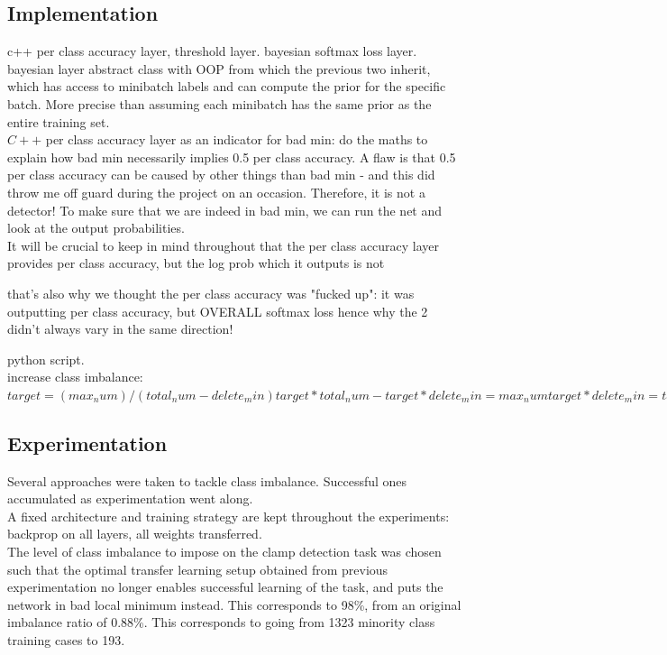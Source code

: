\documentclass[a4paper,11pt]{article}
\begin{document}
\subsection{Implementation}

c++ per class accuracy layer, threshold layer. bayesian softmax loss layer. bayesian layer abstract class with OOP from which the previous two inherit, which has access to minibatch labels and can compute the prior for the specific batch. More precise than assuming each minibatch has the same prior as the entire training set. \\

$C++$ per class accuracy layer as an indicator for bad min: do the maths to explain how bad min necessarily implies 0.5 per class accuracy. A flaw is that 0.5 per class accuracy can be caused by other things than bad min - and this did throw me off guard during the project on an occasion. Therefore, it is not a detector! To make sure that we are indeed in bad min, we can run the net and look at the output probabilities. \\

It will be crucial to keep in mind throughout that the per class accuracy layer provides per class accuracy, but the log prob which it outputs is not 

that's also why we thought the per class accuracy was "fucked up": it was outputting per class accuracy, but OVERALL softmax loss
hence why the 2 didn't always vary in the same direction!

python script. \\

increase class imbalance:
$target = (max_num) / (total_num - delete_min)
target*total_num - target*delete_min = max_num
target*delete_min = target*total_num - max_num
delete_min = total_num - (max_num/target)$


\subsection{Experimentation}

Several approaches were taken to tackle class imbalance. Successful ones accumulated as experimentation went along. \\

A fixed architecture and training strategy are kept throughout the experiments: backprop on all layers, all weights transferred. \\

The level of class imbalance to impose on the clamp detection task was chosen such that the optimal transfer learning setup obtained from previous experimentation no longer enables successful learning of the task, and puts the network in bad local minimum instead. This corresponds to 98\%, from an original imbalance ratio of 0.88\%. This corresponds to going from 1323 minority class training cases to 193. \\
\end{document}
